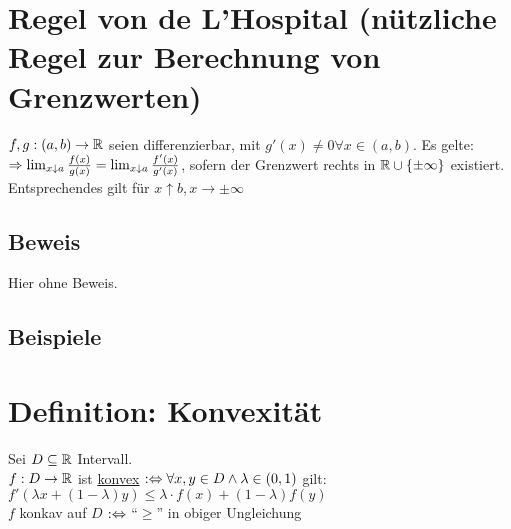 \newpage

\section{Regel von de L'Hospital (nützliche Regel zur Berechnung von Grenzwerten)}\label{11.16}
$f, g: (a,b) \to \mathbb{R}$ seien differenzierbar, mit $g'(x) \neq 0 \forall x \in (a,b)$.\nl
Es gelte:
$\Rightarrow \lim_{x \downarrow a} \frac{f(x)}{g(x)} = \lim_{x \downarrow a} \frac{f'(x)}{g'(x)}$, sofern der Grenzwert rechts in $\mathbb{R} \cup \{\pm \infty\}$ existiert.\nl
Entsprechendes gilt für $x \uparrow b, x \to \pm \infty$

\subsection*{Beweis}
Hier ohne Beweis.

\subsection*{Beispiele}

\section{Definition: Konvexität}\label{11.17}
Sei $D \subseteq \mathbb{R}$ Intervall.\\
$f: D \to \mathbb{R}$ ist \underline{konvex} $:\Leftrightarrow \forall x,y \in D \wedge \lambda \in (0,1)$ gilt: $f'(\lambda x + (1-\lambda) y) \le \lambda \cdot f(x) + (1-\lambda)f(y)$\\
$f$ konkav auf $D$ $:\Leftrightarrow$ "`$\ge$"' in obiger Ungleichung

